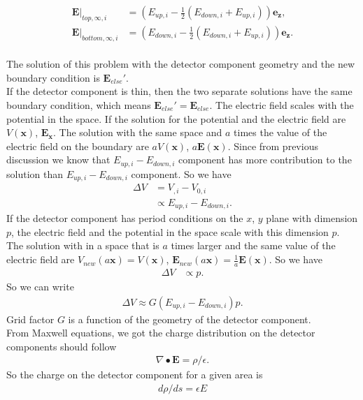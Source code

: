 \begin{align}
\boldsymbol{E}|_{top, \infty, i}  & = (E_{up, i}-\frac{1}{2}(E_{down, i} + E_{up, i})) \boldsymbol{e_z}, \\
\boldsymbol{E}|_{bottom, \infty, i}  & = (E_{down, i}-\frac{1}{2}(E_{down, i} + E_{up, i})) \boldsymbol{e_z}.
\end{align}
\\
The solution of this problem with the detector component geometry and the new boundary condition is $\boldsymbol{E}_{else}'$. 
\\
If the detector component is thin, then the two separate solutions have the same boundary condition, which means $\boldsymbol{E}_{else}' = \boldsymbol{E}_{else}$. 
The electric field scales with the potential in the space. If the solution for the potential and the electric field are $V(\boldsymbol{x})$, $\boldsymbol{
E}_{\boldsymbol{x}}$. The solution with the same space and $a$ times the value of the electric field on the boundary are $a V(\boldsymbol{x})$, $a \boldsymbol{
E}(\boldsymbol{x})$. Since from previous discussion we know that $E_{up, i}-E_{down,i}$ component has more contribution to the solution than $E_{up, i}-E_{down,i}$ component. So we have
\begin{align} 
\Delta V & = V_{,i}-V_{0,i} \\
		 & \propto E_{up, i}-E_{down,i}.
\end{align}
If the detector component has period conditions on the $x$, $y$ plane with dimension $p$, the electric field and the potential in the space scale with this dimension $p$. The solution with in a space that is $a$ times larger and the same value of the electric field are $V_{new}(a \boldsymbol{x}) = V(\boldsymbol{x}) $, $\boldsymbol{
E}_{new}(a \boldsymbol{x}) = \frac{1}{a}\boldsymbol{
E}(\boldsymbol{x})$. So we have
\begin{align} 
\Delta V & \propto p.
\end{align}
So we can write 
\begin{align}
\Delta V \approx G(E_{up, i}-E_{down,i})p.
\end{align}
Grid factor $G$ is a function of the geometry of the detector component. \\
From Maxwell equations, we got the charge distribution on the detector components should follow 
\begin{align}
 \nabla \bullet \boldsymbol{E} = \rho/ \epsilon.
\end{align}
So the charge on the detector component for a given area is 
\begin{align}
d\rho/ds = \epsilon E
\end{align}
